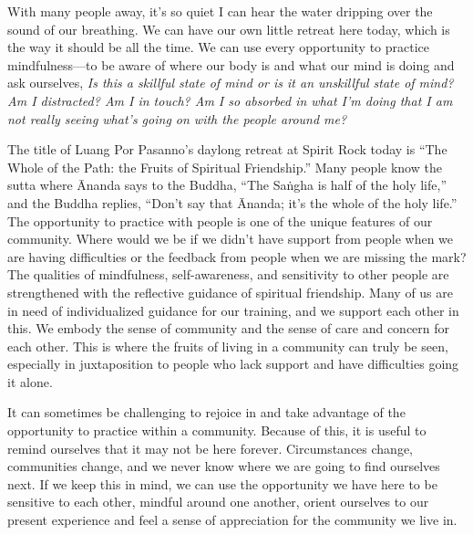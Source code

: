 
With many people away, it's so quiet I can hear the water dripping over 
the sound of our breathing. We can have our own little retreat here 
today, which is the way it should be all the time. We can use every 
opportunity to practice mindfulness---to be aware of where our body is 
and what our mind is doing and ask ourselves, \emph{Is this a skillful 
state of mind or is it an unskillful state of mind? Am I distracted? Am 
I in touch? Am I so absorbed in what I'm doing that I am not really 
seeing what's going on with the people around me?}

The title of Luang Por Pasanno's daylong retreat at Spirit Rock today 
is ``The Whole of the Path: the Fruits of Spiritual Friendship.'' Many 
people know the sutta where Ānanda says to the Buddha, ``The Saṅgha 
is half of the holy life,'' and the Buddha replies, ``Don't say that 
Ānanda; it's the whole of the holy life.'' The opportunity to practice 
with people is one of the unique features of our community. Where would 
we be if we didn't have support from people when we are having 
difficulties or the feedback from people when we are missing the mark? 
The qualities of mindfulness, self-awareness, and sensitivity to other 
people are strengthened with the reflective guidance of spiritual 
friendship. Many of us are in need of individualized guidance for our 
training, and we support each other in this. We embody the sense of 
community and the sense of care and concern for each other. This is 
where the fruits of living in a community can truly be seen, especially 
in juxtaposition to people who lack support and have difficulties going 
it alone.

It can sometimes be challenging to rejoice in and take advantage of the 
opportunity to practice within a community. Because of this, it is 
useful to remind ourselves that it may not be here forever. 
Circumstances change, communities change, and we never know where we 
are going to find ourselves next. If we keep this in mind, we can use 
the opportunity we have here to be sensitive to each other, mindful 
around one another, orient ourselves to our present experience and feel 
a sense of appreciation for the community we live in.

